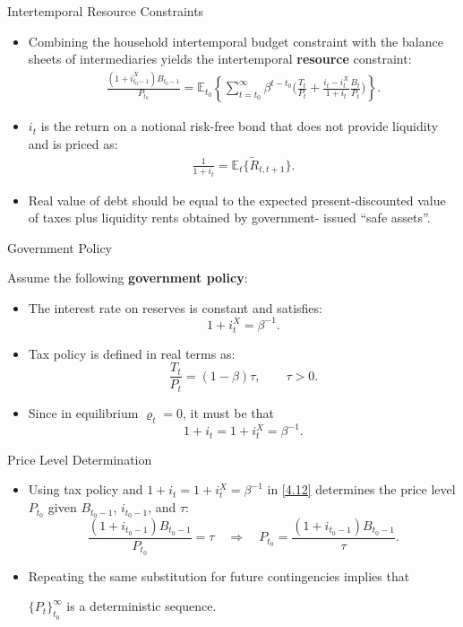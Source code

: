 \documentclass[11pt,aspectratio=169]{beamer}
\newcommand{\E}{\mathbb{E}}
\begin{document}
\begin{frame}{Intertemporal Resource Constraints}
\begin{itemize}

\item Combining the household intertemporal budget constraint with the balance sheets of intermediaries yields the intertemporal \textbf{resource} constraint:
\begin{align}
\frac{(1+i_{t_0-1}^X)B_{t_0-1}}{P_{t_0}} = \E_{t_0}\left\{\sum_{t=t_0}^{\infty}\beta^{t-t_0}\Big( \frac{T_t}{P_t} + \frac{i_t - i_t^X}{1+i_t}\frac{B_t}{P_t}\Big)\right\}. \label{4.12}
\end{align}
  \item $i_t$ is the return on a notional risk-free bond that does not provide liquidity and is priced as:
\begin{align}
    \frac{1}{1+i_t}=\E_t\{\tilde{R}_{t,t+1}\}. \label{4.13}
\end{align}
  \item Real value of debt should be equal to the expected present-discounted value of taxes plus liquidity rents obtained by government-
issued “safe assets”.
\end{itemize}
\end{frame}
\begin{frame}{Government Policy}

Assume the following \textbf{government policy}:
\begin{itemize}
    \item The interest rate on reserves is constant and satisfies:  
    \[
    1 + i_t^X = \beta^{-1}.
    \]
    \item Tax policy is defined in real terms as:  
    \[
    \frac{T_t}{P_t} = (1-\beta)\tau, \qquad \tau > 0.
    \]

\item Since in equilibrium $\varrho_t = 0$, it must be that
\[
1 + i_t = 1 + i_t^X = \beta^{-1}.
\]
\end{itemize}

\end{frame}


\begin{frame}{Price Level Determination}
\small
\begin{itemize}

\item Using tax policy and $1+i_t = 1+i_t^X = \beta^{-1}$ in \eqref{4.12} determines the price level $P_{t_0}$ given $B_{t_0-1}$, $i_{t_0-1}$, and $\tau$:
\[
\frac{(1+i_{t_0-1})B_{t_0-1}}{P_{t_0}} = \tau
\quad\Rightarrow\quad
P_{t_0} = \frac{(1+i_{t_0-1})B_{t_0-1}}{\tau}.
\]
\vspace{1em}
\item Repeating the same substitution for future contingencies implies that 

$\{P_t\}_{t_0}^{\infty}$ is a deterministic sequence.


\end{itemize}
\end{frame}
\end{document}
